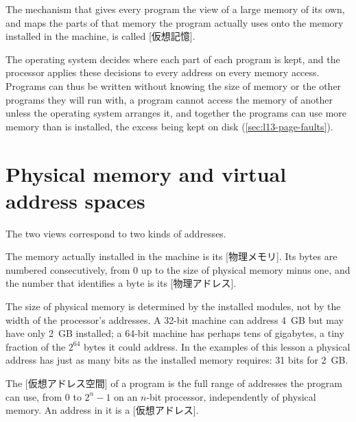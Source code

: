 \documentclass[../main.tex]{subfiles}
\begin{document}
\begin{definition}
  The mechanism that gives every program the view of a large memory of its
  own, and maps the parts of that memory the program actually uses onto the
  memory installed in the machine, is called [仮想記憶].
\end{definition}

The operating system decides where each part of each program is kept, and the
processor applies these decisions to every address on every memory access.
Programs can thus be written without knowing the size of memory or the other
programs they will run with, a program cannot access the memory of another
unless the operating system arranges it, and together the programs can use
more memory than is installed, the excess being kept on disk
(\cref{sec:l13-page-faults}).

\section{Physical memory and virtual address spaces}
\label{sec:l13-views}

The two views correspond to two kinds of addresses.

\begin{definition}
  The memory actually installed in the machine is its
  [物理メモリ].  Its bytes are numbered consecutively,
  from 0 up to the size of physical memory minus one, and the number that
  identifies a byte is its [物理アドレス].
\end{definition}

The size of physical memory is determined by the installed modules, not by
the width of the processor's addresses.  A 32-bit machine can address 4~GB
but may have only 2~GB installed; a 64-bit machine has perhaps tens of
gigabytes, a tiny fraction of the $2^{64}$ bytes it could address.  In the
examples of this lesson a physical address has just as many bits as the
installed memory requires: 31 bits for 2~GB.

\begin{definition}
  The [仮想アドレス空間] of a program is the full
  range of addresses the program can use, from 0 to $2^{n}-1$ on an $n$-bit
  processor, independently of physical memory.  An address in it is a
  [仮想アドレス].
\end{definition}
\end{document}
